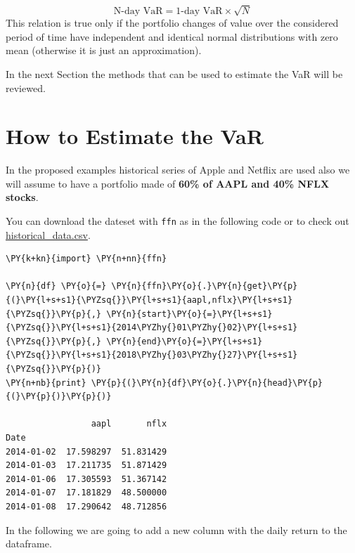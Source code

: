 \begin{equation}
\textrm{N-day VaR} = \textrm{1-day VaR}\times \sqrt{N}
\label{eq:var_horizon}
\end{equation}
This relation is true only if the portfolio changes of value over
the considered period of time have independent and identical normal
distributions with zero mean (otherwise it is just an approximation).

In the next Section the methods that can be used to estimate the VaR
will be reviewed.

\section{How to Estimate the VaR}
\label{how-to-estimate-the-var}

In the proposed examples historical series of Apple and Netflix
are used also we will assume to have a portfolio made of 
\textbf{60\% of AAPL and 40\% NFLX stocks}.
 
You can download the dateset with \texttt{ffn} as in the following code or to
check out \href{https://raw.githubusercontent.com/matteosan1/finance_course/develop/libro/input_files/historical_data.csv}{historical\_data.csv}.

\begin{codebox}
\begin{Verbatim}[commandchars=\\\{\}]
\PY{k+kn}{import} \PY{n+nn}{ffn}
	
\PY{n}{df} \PY{o}{=} \PY{n}{ffn}\PY{o}{.}\PY{n}{get}\PY{p}{(}\PY{l+s+s1}{\PYZsq{}}\PY{l+s+s1}{aapl,nflx}\PY{l+s+s1}{\PYZsq{}}\PY{p}{,} \PY{n}{start}\PY{o}{=}\PY{l+s+s1}{\PYZsq{}}\PY{l+s+s1}{2014\PYZhy{}01\PYZhy{}02}\PY{l+s+s1}{\PYZsq{}}\PY{p}{,} \PY{n}{end}\PY{o}{=}\PY{l+s+s1}{\PYZsq{}}\PY{l+s+s1}{2018\PYZhy{}03\PYZhy{}27}\PY{l+s+s1}{\PYZsq{}}\PY{p}{)}
\PY{n+nb}{print} \PY{p}{(}\PY{n}{df}\PY{o}{.}\PY{n}{head}\PY{p}{(}\PY{p}{)}\PY{p}{)}

                 aapl       nflx
Date
2014-01-02  17.598297  51.831429
2014-01-03  17.211735  51.871429
2014-01-06  17.305593  51.367142
2014-01-07  17.181829  48.500000
2014-01-08  17.290642  48.712856
\end{Verbatim}
\end{codebox}
\noindent
In the following we are going to add a new column with the daily return to the dataframe.

